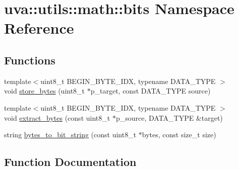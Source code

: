 \hypertarget{namespaceuva_1_1utils_1_1math_1_1bits}{}\section{uva\+:\+:utils\+:\+:math\+:\+:bits Namespace Reference}
\label{namespaceuva_1_1utils_1_1math_1_1bits}
\subsection*{Functions}
\begin{DoxyCompactItemize}
\item 
{\footnotesize template$<$uint8\+\_\+t B\+E\+G\+I\+N\+\_\+\+B\+Y\+T\+E\+\_\+\+I\+D\+X, typename D\+A\+T\+A\+\_\+\+T\+Y\+P\+E $>$ }\\void \hyperlink{namespaceuva_1_1utils_1_1math_1_1bits_af1d8caab025bbfaa1f0009bb2f16c7e0}{store\+\_\+bytes} (uint8\+\_\+t $\ast$p\+\_\+target, const D\+A\+T\+A\+\_\+\+T\+Y\+P\+E source)
\item 
{\footnotesize template$<$uint8\+\_\+t B\+E\+G\+I\+N\+\_\+\+B\+Y\+T\+E\+\_\+\+I\+D\+X, typename D\+A\+T\+A\+\_\+\+T\+Y\+P\+E $>$ }\\void \hyperlink{namespaceuva_1_1utils_1_1math_1_1bits_a223361a944f97650bd506bf51add3b50}{extract\+\_\+bytes} (const uint8\+\_\+t $\ast$p\+\_\+source, D\+A\+T\+A\+\_\+\+T\+Y\+P\+E \&target)
\item 
string \hyperlink{namespaceuva_1_1utils_1_1math_1_1bits_ad78f96a52057355f5d701cb164d4fe57}{bytes\+\_\+to\+\_\+bit\+\_\+string} (const uint8\+\_\+t $\ast$bytes, const size\+\_\+t size)
\end{DoxyCompactItemize}


\subsection{Function Documentation}
\hypertarget{namespaceuva_1_1utils_1_1math_1_1bits_ad78f96a52057355f5d701cb164d4fe57}{}
